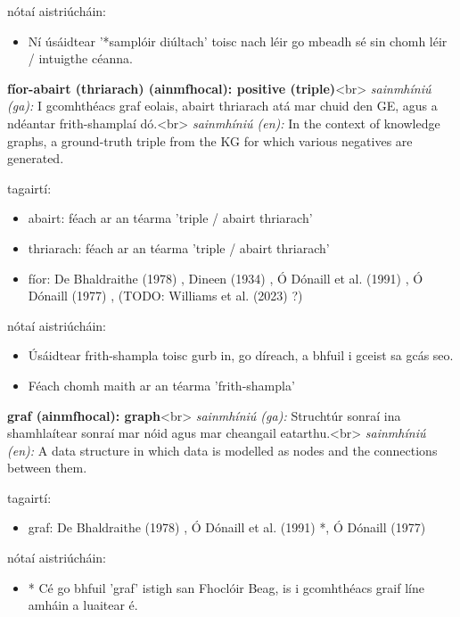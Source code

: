 \documentclass{article}
\begin{document}
nótaí aistriúcháin:
\begin{itemize}
	\item Ní úsáidtear '*samplóir diúltach' toisc nach léir go mbeadh sé sin chomh léir / intuigthe céanna.
\end{itemize}


\textbf{fíor-abairt (thriarach) (ainmfhocal): positive (triple)}<br>
\textit{sainmhíniú (ga):} I gcomhthéacs graf eolais, abairt thriarach atá mar chuid den GE, agus a ndéantar frith-shamplaí dó.<br>
\textit{sainmhíniú (en):} In the context of knowledge graphs, a ground-truth triple from the KG for which various negatives are generated.

tagairtí:
\begin{itemize}
	\item abairt: féach ar an téarma 'triple / abairt thriarach'
	\item thriarach: féach ar an téarma 'triple / abairt thriarach'
	\item fíor: De Bhaldraithe (1978) \cite{de-bhaldraithe}, Dineen (1934) \cite{dineen}, Ó Dónaill et al. (1991) \cite{focloir-beag}, Ó Dónaill (1977) \cite{odonaill}, (TODO: Williams et al. (2023) \cite{storchiste}?)
\end{itemize}

nótaí aistriúcháin:
\begin{itemize}
	\item Úsáidtear frith-shampla toisc gurb in, go díreach, a bhfuil i gceist sa gcás seo.
	\item Féach chomh maith ar an téarma 'frith-shampla'
\end{itemize}


\textbf{graf (ainmfhocal): graph}<br>
\textit{sainmhíniú (ga):} Struchtúr sonraí ina shamhlaítear sonraí mar nóid agus mar cheangail eatarthu.<br>
\textit{sainmhíniú (en):} A data structure in which data is modelled as nodes and the connections between them.

tagairtí:
\begin{itemize}
	\item graf: De Bhaldraithe (1978) \cite{de-bhaldraithe}, Ó Dónaill et al. (1991) \cite{focloir-beag}*, Ó Dónaill (1977) \cite{odonaill}
\end{itemize}

nótaí aistriúcháin:
\begin{itemize}
	\item * Cé go bhfuil 'graf' istigh san Fhoclóir Beag, is i gcomhthéacs graif líne amháin a luaitear é.
\end{itemize}
\end{document}
